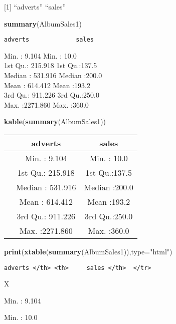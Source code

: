 \documentclass[]{article}
\newenvironment{Shaded}{\begin{snugshade}}{\end{snugshade}}
\newcommand{\KeywordTok}[1]{\textcolor[rgb]{0.13,0.29,0.53}{\textbf{#1}}}
\newcommand{\DataTypeTok}[1]{\textcolor[rgb]{0.13,0.29,0.53}{#1}}
\newcommand{\StringTok}[1]{\textcolor[rgb]{0.31,0.60,0.02}{#1}}
\newcommand{\NormalTok}[1]{#1}
\begin{document}
{[}1{]} ``adverts'' ``sales''

\begin{Shaded}
\begin{Highlighting}[]
\KeywordTok{summary}\NormalTok{(AlbumSales1)}
\end{Highlighting}
\end{Shaded}

\begin{verbatim}
adverts             sales      
\end{verbatim}

Min. : 9.104 Min. : 10.0\\
1st Qu.: 215.918 1st Qu.:137.5\\
Median : 531.916 Median :200.0\\
Mean : 614.412 Mean :193.2\\
3rd Qu.: 911.226 3rd Qu.:250.0\\
Max. :2271.860 Max. :360.0

\begin{Shaded}
\begin{Highlighting}[]
\KeywordTok{kable}\NormalTok{(}\KeywordTok{summary}\NormalTok{(AlbumSales1))}
\end{Highlighting}
\end{Shaded}

\begin{longtable}[]{@{}lcc@{}}
\toprule
& adverts & sales\tabularnewline
\midrule
\endhead
& Min. : 9.104 & Min. : 10.0\tabularnewline
& 1st Qu.: 215.918 & 1st Qu.:137.5\tabularnewline
& Median : 531.916 & Median :200.0\tabularnewline
& Mean : 614.412 & Mean :193.2\tabularnewline
& 3rd Qu.: 911.226 & 3rd Qu.:250.0\tabularnewline
& Max. :2271.860 & Max. :360.0\tabularnewline
\bottomrule
\end{longtable}

\begin{Shaded}
\begin{Highlighting}[]
\KeywordTok{print}\NormalTok{(}\KeywordTok{xtable}\NormalTok{(}\KeywordTok{summary}\NormalTok{(AlbumSales1)),}\DataTypeTok{type=}\StringTok{"html"}\NormalTok{)}
\end{Highlighting}
\end{Shaded}

\begin{verbatim}
adverts </th> <th>     sales </th>  </tr>
\end{verbatim}

X

Min. : 9.104

Min. : 10.0
\end{document}
